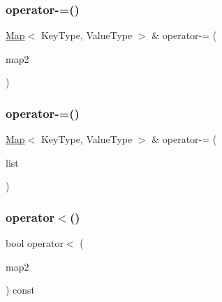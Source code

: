 \mbox{\label{classMap_a5c6ee663a9c3956c53220cfff8659f1c}} 
\subsubsection{\texorpdfstring{operator-\/=()}{operator-=()}\hspace{0.1cm}{\footnotesize\ttfamily [1/2]}}
{\footnotesize\ttfamily \mbox{\hyperlink{classMap}{Map}}$<$ Key\+Type, Value\+Type $>$ \& operator-\/= (\begin{DoxyParamCaption}\item[{const \mbox{\hyperlink{classMap}{Map}}$<$ Key\+Type, Value\+Type $>$ \&}]{map2 }\end{DoxyParamCaption})}

\mbox{\label{classMap_a627c9183807211699369ce4a6e763e33}} 
\subsubsection{\texorpdfstring{operator-\/=()}{operator-=()}\hspace{0.1cm}{\footnotesize\ttfamily [2/2]}}
{\footnotesize\ttfamily \mbox{\hyperlink{classMap}{Map}}$<$ Key\+Type, Value\+Type $>$ \& operator-\/= (\begin{DoxyParamCaption}\item[{std\+::initializer\+\_\+list$<$ std\+::pair$<$ Key\+Type, Value\+Type $>$ $>$}]{list }\end{DoxyParamCaption})}

\mbox{\label{classMap_aa7853d8fda7f6e2e8a353dfed157c376}} 
\subsubsection{\texorpdfstring{operator$<$()}{operator<()}}
{\footnotesize\ttfamily bool operator$<$ (\begin{DoxyParamCaption}\item[{const \mbox{\hyperlink{classMap}{Map}}$<$ Key\+Type, Value\+Type $>$ \&}]{map2 }\end{DoxyParamCaption}) const}

